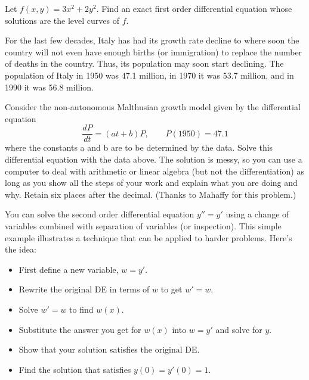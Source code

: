 \documentclass[12pt,letterpaper]{hmcpset}
\begin{document}
\begin{solution}
    \vfill
\end{solution}
\clearpage

\begin{problem}[B5]
    Let $f(x, y) = 3x^2 + 2y^2$. Find an exact first
    order differential equation whose solutions are 
    the level curves of $f$.
\end{problem}

\begin{solution}
    \vfill
\end{solution}
\clearpage

\begin{problem}[B6]
    For the last few decades, Italy has had its growth
    rate decline to where soon the country will not even 
    have enough births (or immigration) to replace the
    number of deaths in the country. Thus, its population
    may soon start declining. The population of Italy in
    1950 was 47.1 million, in 1970 it was 53.7 million, and 
    in 1990 it was 56.8 million. 
    
    Consider the non-autonomous Malthusian growth model
    given by the differential equation
    \[
        \frac{dP}{dt} = (at+b)P, \qquad P(1950) = 47.1
    \]
    where the constants a and b are to be determined by the 
    data. Solve this differential equation with the data 
    above. The solution is messy, so you can use a computer
    to deal with arithmetic or linear algebra (but not the 
    differentiation) as long as you show all the steps of 
    your work and explain what you are doing and why. Retain 
    six places after the decimal. (Thanks to Mahaffy for 
    this problem.)
\end{problem}

\begin{solution}
    \vfill
\end{solution}
\clearpage

\begin{problem}[B7]
    You can solve the second order differential equation
    $y'' = y'$ using a change of variables combined with
    separation of variables (or inspection). This simple
    example illustrates a technique that can be applied
    to harder problems. Here’s the idea:
    \begin{itemize}
        \item First define a new variable, $w = y'$.
        \item Rewrite the original DE in terms of $w$ to get $w' = w$.
        \item Solve $w' = w$ to find $w(x)$.
        \item Substitute the answer you get for $w(x)$
            into $w = y'$ and solve for $y$.
        \item Show that your solution satisfies the original DE.
        \item Find the solution that satisfies $y(0) = y'(0) = 1$.
    \end{itemize}
\end{problem}
\end{document}
